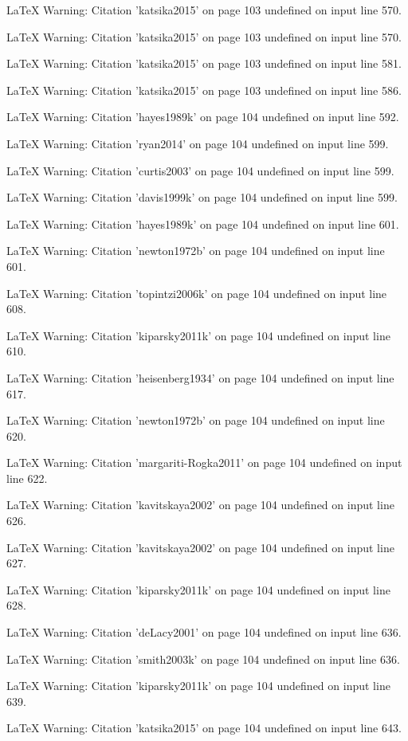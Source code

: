 LaTeX Warning: Citation 'katsika2015' on page 103 undefined on input line 570.


LaTeX Warning: Citation 'katsika2015' on page 103 undefined on input line 570.


LaTeX Warning: Citation 'katsika2015' on page 103 undefined on input line 581.


LaTeX Warning: Citation 'katsika2015' on page 103 undefined on input line 586.


LaTeX Warning: Citation 'hayes1989k' on page 104 undefined on input line 592.


LaTeX Warning: Citation 'ryan2014' on page 104 undefined on input line 599.


LaTeX Warning: Citation 'curtis2003' on page 104 undefined on input line 599.


LaTeX Warning: Citation 'davis1999k' on page 104 undefined on input line 599.


LaTeX Warning: Citation 'hayes1989k' on page 104 undefined on input line 601.


LaTeX Warning: Citation 'newton1972b' on page 104 undefined on input line 601.


LaTeX Warning: Citation 'topintzi2006k' on page 104 undefined on input line 608.


LaTeX Warning: Citation 'kiparsky2011k' on page 104 undefined on input line 610.


LaTeX Warning: Citation 'heisenberg1934' on page 104 undefined on input line 617.


LaTeX Warning: Citation 'newton1972b' on page 104 undefined on input line 620.


LaTeX Warning: Citation 'margariti-Rogka2011' on page 104 undefined on input line 622.


LaTeX Warning: Citation 'kavitskaya2002' on page 104 undefined on input line 626.


LaTeX Warning: Citation 'kavitskaya2002' on page 104 undefined on input line 627.


LaTeX Warning: Citation 'kiparsky2011k' on page 104 undefined on input line 628.


LaTeX Warning: Citation 'deLacy2001' on page 104 undefined on input line 636.


LaTeX Warning: Citation 'smith2003k' on page 104 undefined on input line 636.


LaTeX Warning: Citation 'kiparsky2011k' on page 104 undefined on input line 639.


LaTeX Warning: Citation 'katsika2015' on page 104 undefined on input line 643.



